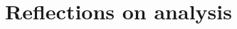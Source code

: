 \documentclass[10pt,a4paper,twocolumn]{article}
\begin{document}
\section{Reflections on analysis} %
\label{sec:reflections_on_analysis}





\end{document}
